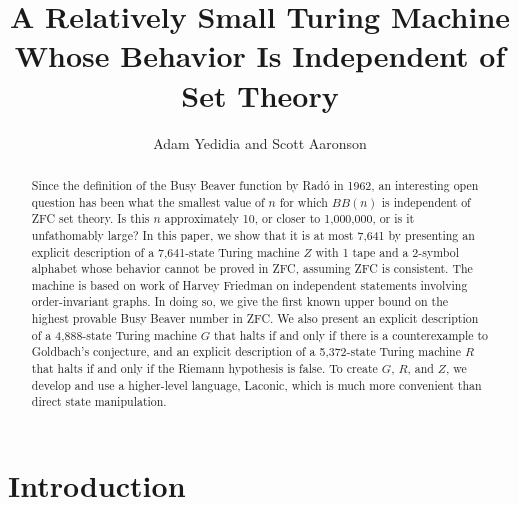 \documentclass[11pt]{article}
\newcommand{\statenumstate}{7,641-state }
\newcommand{\statenum}{7,641 }
\newcommand{\gbstatenumstate}{4,888-state }
\newcommand{\rmstatenumstate}{5,372-state }
\begin{document}
\title{A Relatively Small Turing Machine Whose Behavior Is Independent of Set Theory}
\author{Adam Yedidia and Scott Aaronson}

\maketitle

\begin{abstract}

Since the definition of the Busy Beaver function by Rad\'{o} in 1962, an interesting open question has been what the smallest value of $n$ for which $BB(n)$ is independent of ZFC set theory. Is this $n$ approximately 10, or closer to 1,000,000, or is it unfathomably large? In this paper, we show that it is at most \statenum by presenting an explicit description of a \statenumstate Turing machine $Z$ with 1 tape and a 2-symbol alphabet whose behavior cannot be proved in ZFC, assuming ZFC is consistent. The machine is based on work of Harvey Friedman on independent statements involving order-invariant graphs. In doing so, we give the first known upper bound on the highest provable Busy Beaver number in ZFC. We also present an explicit description of a \gbstatenumstate Turing machine $G$ that halts if and only if there is a counterexample to Goldbach's conjecture, and an explicit description of a \rmstatenumstate Turing machine $R$ that halts if and only if the Riemann hypothesis is false. To create $G$, $R$, and $Z$, we develop and use a higher-level language, Laconic, which is much more convenient than direct state manipulation. 

\end{abstract}

\section{Introduction}

\end{document}
